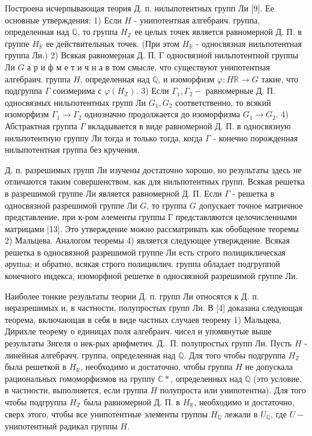 \documentclass[10pt]{article}
\begin{document}
Построена исчерпывающая теория Д. п. нилыпотентных групп Ли [9]. Ее основные утверждения: 1) Если $H$ - унипотентная алгебраич. группа, определенная над $\mathbb{Q}$, то группа $H_{\mathbb{Z}}$ ее целых точек является равномерной Д. П. в группе $H_{\mathbb{R}}$ ее действительных точек. (При этом $H_{\mathbb{R}}$ - односвязная нильпотентная группа Ли.) 2) Всякая равномерная Д. П. Г односвязной нильпотентной группы Ли $G$ а р и ф м е т и ч н а в том смысле, что существуют унипотентная алгебраич. группа $H$, определенная над $\mathbb{Q}$, и изоморфизм $\varphi: H \mathbb{R} \rightarrow G$ такие, что подгруппа $\Gamma$ соизмерима с $\varphi\left(H_{\mathbb{Z}}\right)$. 3) Если $\Gamma_{1}, \Gamma_{2}-$ равномерные Д. П. односвязных нильпотентных групп Ли $G_{1}, G_{2}$ соответственно, то всякий изоморфизм $\Gamma_{1} \rightarrow \Gamma_{2}$ однозначно продолжается до изоморфизма $G_{1} \rightarrow G_{2}$. 4) Абстрактная группа $\Gamma$ вкладывается в виде равномерной Д. П. в односвязную нильпотентную группу Ли тогда и только тогда, когда $\Gamma$ - конечно порожденная нилыпотентная группа без кручения.



Д. п. разрешимых групп Ли изучены достаточно хорошо, но результаты здесь не отличаются таким совершенством, как для нильпотентных групп. Всякая решетка в разрешимой группе Ли является равномерной Д. П. Если $\Gamma$ - решетка в односвязной разрешимой группе Ли $G$, то группа $G$ допускает точное матричное представление, при к-ром әлементы группы $Г$ представляются целочисленными матрицами [13]. Это утверждение можно рассматривать как обобщение теоремы 2) Мальцева. Аналогом теоремы 4) является следующее утверждение. Всякая решетка в односвязной разрешимой группе Ли есть строго полициклическая әрупnа; и обратно, всякая строго полициклич. группа обладает подгруппой конечного индекса, изоморфной решетке в односвязной разрешимой группе Ли.



Наиболее тонкие результаты теории Д. п. групп Ли относятся к Д. п. неразрешимых и, в частности, полупростых групп Ли. В [4] доказана следующая теорема, включающая в себя в виде частных случаев теорему 1) Мальцева, Дирихле теорему о единицах поля алгебраич. чисел и упомянутые выше результаты Зигеля о нек-рых арифметич. Д.. П. полупростых групп Ли. Пусть $H$ - линейная алгебрачч. группа, определенная над $\mathbb{Q}$. Для того чтобы подгруппа $H_{\mathbb{Z}}$ была решеткой в $H_{\mathbb{R}}$, необходимо и достаточно, чтобы группа $H$ не допускала рациональных гомоморфизмов на группу $\mathbb{C} *$, определенных над $\mathbb{Q}$ (это условие, в частности, выполняется, если группа $H$ полупроста или унипотентна). Для того чтобы подгруппа $\dot{H}_{\mathbb{Z}}$ была равномерной Д. П. в $H_{\mathbb{R}}$, необходимо и достаточно, сверх этого, чтобы все унипотентные элементы группы $H_{\mathbb{Q}}$ лежали в $U_{\mathbb{Q}}$, где $U-$ унипотентный радикал группы $H$.
\end{document}
